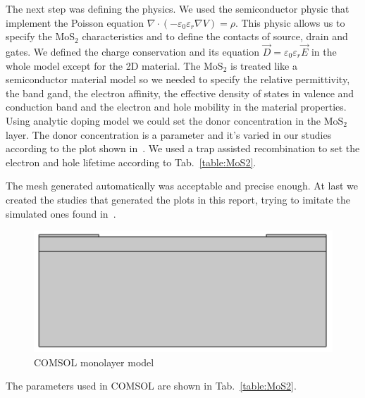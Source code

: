 \documentclass[12pt,a4paper,titlepage]{article}
\begin{document}
The next step was defining the physics. We used the semiconductor physic that implement the Poisson equation $\nabla \cdot (-\varepsilon_0 \varepsilon_r \nabla V) = \rho$. This physic allows us to specify the MoS$_2$ characteristics and to define the contacts of source, drain and gates. We defined the charge conservation and its equation $\vec{D} = \varepsilon_0 \varepsilon_r \vec{E}$ in the whole model except for the 2D material. The MoS$_2$ is treated like a semiconductor material model so we needed to specify the relative permittivity, the band gand, the electron affinity, the effective density of states in valence and conduction band and the electron and hole mobility in the material properties. Using analytic doping model we could set the donor concentration in the MoS$_2$ layer. The donor concentration is a parameter and it's varied in our studies according to the plot shown in~\cite{Howell:MonolayerMultiLayer_MoS2}. We used a trap assisted recombination to set the electron and hole lifetime according to Tab.~\ref{table:MoS2}. 

The mesh generated automatically was acceptable and precise enough. At last we created the studies that generated the plots in this report, trying to imitate the simulated ones found in~\cite{Howell:MonolayerMultiLayer_MoS2}.

\begin{figure}[H]
	\centering
	\includegraphics[width=.7\textwidth]{Immagini/monolayer_model_comsol.png}
	\caption{COMSOL monolayer model}
	\label{fig:monolayer_model_comsol}
\end{figure} 

The parameters used in COMSOL are shown in Tab.~\ref{table:MoS2}.
\end{document}
